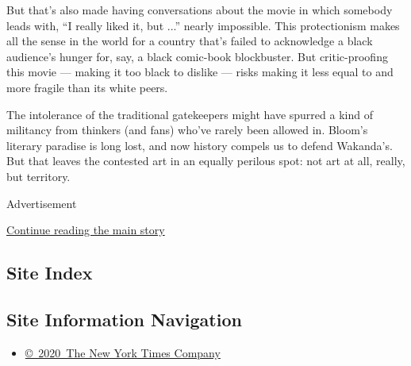 But that's also made having conversations about the movie in which
somebody leads with, ``I really liked it, but ...'' nearly impossible.
This protectionism makes all the sense in the world for a country that's
failed to acknowledge a black audience's hunger for, say, a black
comic-book blockbuster. But critic-proofing this movie --- making it too
black to dislike --- risks making it less equal to and more fragile than
its white peers.

The intolerance of the traditional gatekeepers might have spurred a kind
of militancy from thinkers (and fans) who've rarely been allowed in.
Bloom's literary paradise is long lost, and now history compels us to
defend Wakanda's. But that leaves the contested art in an equally
perilous spot: not art at all, really, but territory.

Advertisement

\protect\hyperlink{after-bottom}{Continue reading the main story}

\hypertarget{site-index}{%
\subsection{Site Index}\label{site-index}}

\hypertarget{site-information-navigation}{%
\subsection{Site Information
Navigation}\label{site-information-navigation}}

\begin{itemize}
\tightlist
\item
  \href{https://help.nytimes3xbfgragh.onion/hc/en-us/articles/115014792127-Copyright-notice}{©~2020~The
  New York Times Company}
\end{itemize}

